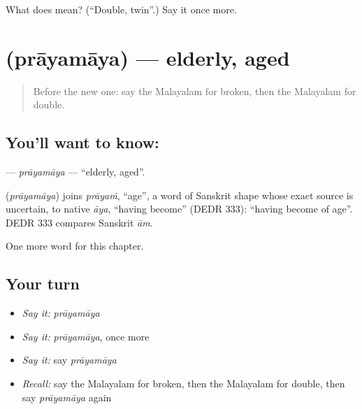 \begin{tcolorbox}[breakable,colback=teal!4,colframe=teal!35!black,title={Before you move on}]
What does  mean? (\textquotedblleft{}Double, twin\textquotedblright{}.) Say it once more.
\end{tcolorbox}
\section[\texorpdfstring{\ml{പ്രായമായ} (prāyamāya)}{പ്രായമായ (prāyamāya)}]{ (prāyamāya) — elderly, aged}

\label{lesson:ML-C247-prayamaya}



\begin{quote}
Before the new one: say the Malayalam for broken, then the Malayalam for double.
\end{quote}

\subsection*{You'll want to know: }
\textbf{} — \emph{prāyamāya} — \textquotedblleft{}elderly, aged\textquotedblright{}.

\begin{cousinweb}
\textbf{} (\emph{prāyamāya}) joins \emph{prāyaṁ}, \textquotedblleft{}age\textquotedblright{}, a word of Sanskrit shape whose exact source is uncertain, to native \emph{āya}, \textquotedblleft{}having become\textquotedblright{} (DEDR 333): \textquotedblleft{}having become of age\textquotedblright{}. DEDR 333 compares Sanskrit \emph{ām}.
\end{cousinweb}

\begin{grammarlens}[title={What you've built}]
One more word for this chapter.
\end{grammarlens}

\subsection*{Your turn}
\begin{itemize}
\raggedright
  \item \emph{Say it:} \emph{prāyamāya}
  \item \emph{Say it:} \emph{prāyamāya}, once more
  \item \emph{Say it:} say \emph{prāyamāya}
  \item \emph{Recall:} say the Malayalam for broken, then the Malayalam for double, then say \emph{prāyamāya} again
\end{itemize}

